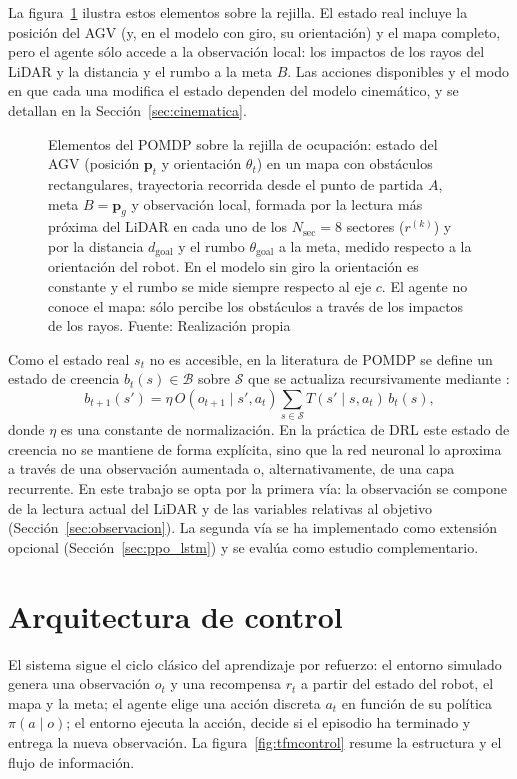 La figura~\ref{fig:pomdp_escena} ilustra estos elementos sobre la rejilla.
El estado real incluye la posición del AGV (y, en el modelo con giro, su
orientación) y el mapa completo, pero el agente sólo accede a la
observación local: los impactos de los rayos del LiDAR y la distancia y el
rumbo a la meta $B$. Las acciones disponibles y el modo en que cada una
modifica el estado dependen del modelo cinemático, y se detallan en la
Sección~\ref{sec:cinematica}.

\begin{figure}[htbp]
    \centering
    
    \caption[Elementos del POMDP sobre la rejilla]{Elementos del POMDP
    sobre la rejilla de ocupación: estado del AGV (posición $\mathbf{p}_t$
    y orientación $\theta_t$) en un mapa con obstáculos rectangulares,
    trayectoria recorrida desde el punto de partida $A$, meta
    $B=\mathbf{p}_g$ y observación local, formada por la lectura más
    próxima del LiDAR en cada uno de los $N_{\text{sec}}=8$ sectores
    ($r^{(k)}$) y por la distancia $d_{\text{goal}}$ y el rumbo
    $\theta_{\text{goal}}$ a la meta, medido respecto a la orientación del
    robot. En el modelo sin giro la orientación es constante y el rumbo se
    mide siempre respecto al eje $c$. El agente no conoce el mapa: sólo
    percibe los obstáculos a través de los impactos de los rayos.
    Fuente: Realización propia}
    \label{fig:pomdp_escena}
\end{figure}

Como el estado real $s_t$ no es accesible, en la literatura de POMDP se
define un estado de creencia $b_t(s)\in\mathcal{B}$ sobre $\mathcal{S}$ que
se actualiza recursivamente mediante \citep{md2024novel}:
\begin{equation}
    b_{t+1}(s') = \eta\, O(o_{t+1}\mid s', a_t) \sum_{s\in\mathcal{S}}
    T(s'\mid s, a_t)\, b_t(s),
    \label{eq:belief_update}
\end{equation}
donde $\eta$ es una constante de normalización. En la práctica de DRL este
estado de creencia no se mantiene de forma explícita, sino que la red
neuronal lo aproxima a través de una observación aumentada o,
alternativamente, de una capa recurrente. En este trabajo se opta por la
primera vía: la observación se compone de la lectura actual del LiDAR y
de las variables relativas al objetivo (Sección~\ref{sec:observacion}).
La segunda vía se ha implementado como extensión opcional
(Sección~\ref{sec:ppo_lstm}) y se evalúa como estudio complementario.

\section{Arquitectura de control}\label{sec:arquitectura}
El sistema sigue el ciclo clásico del aprendizaje por refuerzo:
el entorno simulado genera una observación $o_t$ y una recompensa $r_t$ a
partir del estado del robot, el mapa y la meta; el agente elige una acción
discreta $a_t$ en función de su política $\pi(a\mid o)$; el entorno
ejecuta la acción, decide si el episodio ha terminado y entrega la nueva
observación. La figura~\ref{fig:tfmcontrol} resume la estructura y el flujo de
información.

